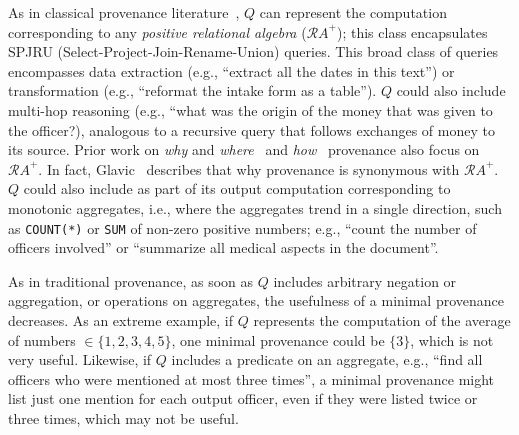

    As in classical provenance literature~\cite{green2007provenance,buneman2001and,cheney2009provenance,glavic2021data},  $Q$
can represent the computation corresponding to 
any {\em positive relational algebra} (${\mathcal RA}^+$); this class 
encapsulates SPJRU (Select-Project-Join-Rename-Union) queries. This broad class of queries
encompasses data extraction (e.g., ``extract all
the dates in this text'') or transformation 
(e.g., ``reformat the intake form as a table''). 
$Q$ could also include multi-hop reasoning (e.g., ``what was the origin of
the money that was given to the officer?), analogous to 
a recursive query that follows exchanges of money to its source.
Prior work on {\em why} and {\em where}~\cite{buneman2001and} and {\em how}~\cite{green2007provenance} provenance
also focus on ${\mathcal RA}^+$. 
In fact, Glavic~\cite{glavic2021data} describes
that why provenance is synonymous with ${\mathcal RA}^+$. 
$Q$ could also include as part of its output computation
corresponding to monotonic aggregates, i.e., where
the aggregates trend in a single direction, such as 
\texttt{COUNT(*)} 
or \texttt{SUM} of non-zero positive numbers; e.g., ``count the number of officers involved''
or ``summarize all medical aspects in the document''. 

As in traditional provenance, as soon as $Q$ includes
arbitrary negation or aggregation, or operations on aggregates, 
the usefulness 
of a minimal provenance decreases.
As an extreme example, if $Q$ represents the computation of 
the average of numbers $ \in  \{1, 2, 3, 4, 5\}$,
one minimal provenance could be $\{3\}$, which is not
very useful. 
Likewise, if $Q$ includes a predicate on an aggregate, e.g., ``find
all officers who were mentioned at most three times'',
a minimal provenance might list 
just one mention for each output officer, 
even if they were listed twice or three times, which may not be useful. 

